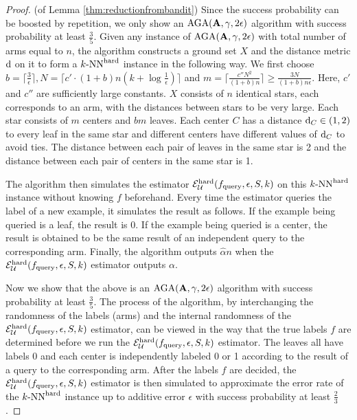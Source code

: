 \begin{proof}(of Lemma \ref{thm:reductionfrombandit})
Since the success probability can be boosted by repetition, we only show an ${\mathrm{AGA}}(\mathbf A,\gamma,2\epsilon)$ algorithm with success probability at least $\frac{3}{5}$. Given any instance of ${\mathrm{AGA}}(\mathbf A,\gamma,2\epsilon)$ with total number of arms equal to $n$, the algorithm constructs a ground set $X$ and the distance metric ${\mathrm{d}}$ on it to form a ${\text{$k$-NN}^{\mathrm{hard}}}$ instance in the following way. We first choose $b=\lceil\frac{3}{\epsilon}\rceil,N=\lceil c'\cdot (1+b)n(k+\log\frac{1}{\epsilon})\rceil$ and $m=\lceil\frac{c''N^2}{(1+b)n}\rceil\geq\frac{3N}{(1+b)n\epsilon}$. Here, $c'$ and $c''$ are sufficiently large constants. $X$ consists of $n$ identical stars, each corresponds to an arm, with the distances between stars to be very large. Each star consists of $m$ centers and $bm$ leaves. Each center $C$ has a distance ${\mathrm{d}}_C\in(1,2)$ to every leaf in the same star and different centers have different values of ${\mathrm{d}}_C$ to avoid ties. The distance between each pair of leaves in the same star is 2 and the distance between each pair of centers in the same star is 1. 

The algorithm then simulates the estimator $\mathcal{E}^{\mathrm{hard}}_{{\mathcal{U}}}(f_{\mathrm{query}},\epsilon,S,k)$ on this ${\text{$k$-NN}^{\mathrm{hard}}}$ instance without knowing $f$ beforehand. Every time the estimator queries the label of a new example, it simulates the result as follows. If the example being queried is a leaf, the result is 0. If the example being queried is a center, the result is obtained to be the same result of an independent query to the corresponding arm. Finally, the algorithm outputs $\hat\alpha n$ when the $\mathcal{E}^{\mathrm{hard}}_{{\mathcal{U}}}(f_{\mathrm{query}},\epsilon,S,k)$ estimator outputs $\alpha$.

Now we show that the above is an ${\mathrm{AGA}}(\mathbf A,\gamma,2\epsilon)$ algorithm with success probability at least $\frac{3}{5}$. The process of the algorithm, by interchanging the randomness of the labels (arms) and the internal randomness of the $\mathcal{E}^{\mathrm{hard}}_{{\mathcal{U}}}(f_{\mathrm{query}},\epsilon,S,k)$ estimator, can be viewed in the way that the true labels $f$ are determined before we run the $\mathcal{E}^{\mathrm{hard}}_{{\mathcal{U}}}(f_{\mathrm{query}},\epsilon,S,k)$ estimator. The leaves all have labels 0 and each center is independently labeled 0 or 1 according to the result of a query to the corresponding arm. After the labels $f$ are decided, the $\mathcal{E}^{\mathrm{hard}}_{{\mathcal{U}}}(f_{\mathrm{query}},\epsilon,S,k)$ estimator is then simulated  to approximate the error rate of the ${\text{$k$-NN}^{\mathrm{hard}}}$ instance up to additive error $\epsilon$ with success probability at least $\frac{2}{3}$. 


\end{proof}
